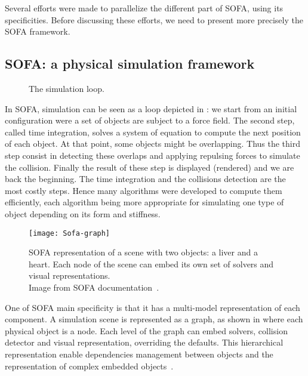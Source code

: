 Several efforts were made to parallelize the different part of \gls{SOFA}, using its specificities.
Before discussing these efforts, we need to present more precisely the \gls{SOFA} framework.

\subsection{SOFA: a physical simulation framework}

\begin{figure}[htb]
    \centering
    
    \caption{The simulation loop.}
    \label{fig:simu-pipeline}
\end{figure}

In \gls{SOFA}, simulation can be seen as a loop depicted in : we start from an initial configuration were a set of objects are subject to a force field.
The second step, called time integration, solves a system of equation to compute the next position of each object.
At that point, some objects might be overlapping.
Thus the third step consist in detecting these overlaps and applying repulsing forces to simulate the collision.
Finally the result of these step is displayed (rendered) and we are back the beginning.
The time integration and the collisions detection are the most costly steps.
Hence many algorithms  were developed to compute them efficiently,  each algorithm being more appropriate for simulating one type of object depending on its form and stiffness.

\begin{figure}[htb]
    \centering
    \texttt{[image: Sofa-graph]}
    \caption[Example of SOFA scene graph.]{SOFA representation of a scene with two objects: a liver and a
        heart. Each node of the scene can embed its own set of solvers and
        visual representations.\\
        Image from SOFA documentation~\cite{SOFA16Sofa}.}
    \label{fig:sofa-tree}
\end{figure}

One of \gls{SOFA} main specificity is that it has a multi-model representation of each component.
A simulation scene is represented as a graph, as shown in  where each physical object is a node.
Each level of the graph can embed solvers, collision detector and visual representation, overriding the defaults.
This hierarchical representation enable dependencies management between objects and the representation of complex embedded objects~\cite{Nesme09Preserving,Faure11Sparse}.

